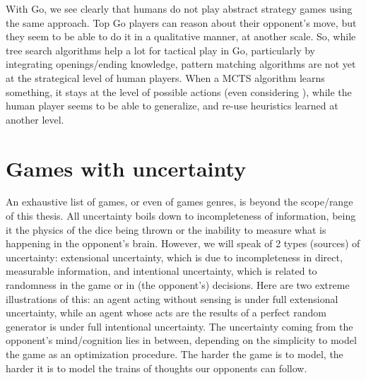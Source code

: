 With Go, we see clearly that humans do not play abstract strategy games using the same approach. Top Go players can reason about their opponent's move, but they seem to be able to do it in a qualitative manner, at another scale. So, while tree search algorithms help a lot for tactical play in Go, particularly by integrating openings/ending knowledge, pattern matching algorithms are not yet at the strategical level of human players. When a MCTS algorithm learns something, it stays at the level of possible actions (even considering ), while the human player seems to be able to generalize, and re-use heuristics learned at another level.


\section{Games with uncertainty}
An exhaustive list of games, or even of games genres, is beyond the scope/range of this thesis. %
All uncertainty boils down to incompleteness of information, being it the physics of the dice being thrown or the inability to measure what is happening in the opponent's brain. However,  we will speak of 2 types (sources) of uncertainty: extensional uncertainty, which is due to incompleteness in direct, measurable information, and intentional uncertainty, which is related to randomness in the game or in (the opponent's) decisions. Here are two extreme illustrations of this: an agent acting without sensing is under full extensional uncertainty, while an agent whose acts are the results of a perfect random generator is under full intentional uncertainty. The uncertainty coming from the opponent's mind/cognition lies in between, depending on the simplicity to model the game as an optimization procedure. The harder the game is to model, the harder it is to model the trains of thoughts our opponents can follow.

